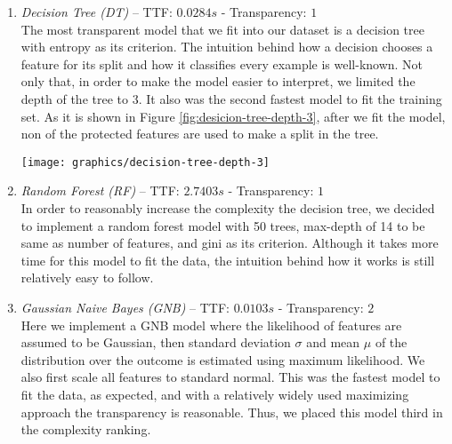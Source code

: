 \begin{enumerate}
	\item \textit{Decision Tree (DT)} -- TTF: $0.0284 s$ - Transparency: $1$ \\
The most transparent model that we fit into our dataset is a decision tree with entropy as its criterion. The intuition behind how a decision chooses a feature for its split and how it classifies every example is well-known. Not only that, in order to make the model easier to interpret, we limited the depth of the tree to 3. It also was the second fastest model to fit the training set. As it is shown in Figure \ref{fig:desicion-tree-depth-3}, after we fit the model, non of the protected features are used to make a split in the tree.
	
\begin{figure*}
	\begin{center}
    	\centering
        \texttt{[image: graphics/decision-tree-depth-3]}
        \caption{Decision Tree classier with entropy criterion and depth of 3. As it is shown in the tree, no decision is made based on any of the protected features.}
        \label{fig:desicion-tree-depth-3}
     \end{center}
\end{figure*}


\item \textit{Random Forest (RF)} -- TTF: $2.7403 s$ - Transparency: $1$ \\
In order to reasonably increase the complexity the decision tree, we decided to implement a random forest model with 50 trees, max-depth of 14 to be same as number of features, and gini as its criterion. Although it takes more time for this model to fit the data, the intuition behind how it works is still relatively easy to follow.

\item \textit{Gaussian Naive Bayes (GNB)} -- TTF: $0.0103 s$ - Transparency: $2$ \\
Here we implement a GNB model where the likelihood of features are assumed to be Gaussian, then standard deviation $\sigma$ and mean  $\mu$ of the distribution over the outcome is estimated using maximum likelihood. We also first scale all features to standard normal. This was the fastest model to fit the data, as expected, and with a relatively widely used maximizing approach the transparency is reasonable.  Thus, we placed this model third in the complexity ranking.


\end{enumerate}
